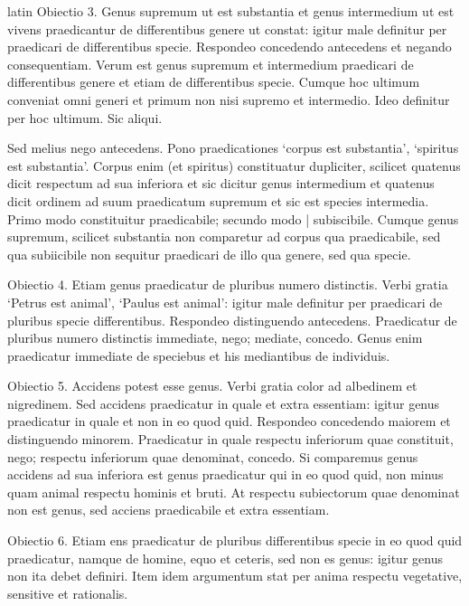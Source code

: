 \begin{otherlanguage*}{latin}
\pstart
Obiectio 3. Genus supremum ut est substantia et genus intermedium ut est vivens praedicantur de differentibus genere ut constat:
igitur male definitur per praedicari de differentibus specie. Respondeo concedendo antecedens et negando consequentiam. Verum est genus supremum et intermedium praedicari de differentibus genere et etiam de differentibus specie. Cumque hoc ultimum conveniat omni generi et primum non nisi supremo et intermedio. Ideo definitur per hoc ultimum. Sic aliqui. 
\pend

\pstart
Sed melius nego antecedens. Pono praedicationes `corpus est substantia', `spiritus est substantia'. Corpus enim (et spiritus) constituatur dupliciter, scilicet quatenus dicit respectum ad sua inferiora et sic dicitur genus intermedium et quatenus dicit ordinem ad suum praedicatum supremum et sic est species intermedia. Primo modo constituitur praedicabile; secundo modo \textnormal{|} subiscibile. Cumque genus supremum, scilicet substantia non comparetur ad corpus qua praedicabile, sed qua subiicibile non sequitur praedicari de illo qua genere, sed qua specie. 
\pend

\pstart
Obiectio 4. Etiam genus praedicatur de pluribus numero distinctis. Verbi gratia `Petrus est animal', `Paulus est animal':
igitur male definitur per praedicari de pluribus specie differentibus. Respondeo distinguendo antecedens. Praedicatur de pluribus numero distinctis immediate, nego; mediate, concedo. Genus enim praedicatur immediate de speciebus et his mediantibus de individuis. 
\pend

\pstart
Obiectio 5. Accidens potest esse genus. Verbi gratia color ad albedinem et nigredinem. Sed accidens praedicatur in quale et extra essentiam:
igitur genus praedicatur in quale et non in eo quod quid. Respondeo concedendo maiorem et distinguendo minorem. Praedicatur in quale respectu inferiorum quae constituit, nego; respectu inferiorum quae denominat, concedo. Si comparemus genus accidens ad sua inferiora est genus praedicatur qui in eo quod quid, non minus quam animal respectu hominis et bruti. At respectu subiectorum quae denominat non est genus, sed acciens praedicabile et extra essentiam. 
\pend

\pstart
Obiectio 6. Etiam ens praedicatur de pluribus differentibus specie in eo quod quid praedicatur, namque de homine, equo et ceteris, sed non es genus:
igitur genus non ita debet definiri. Item idem argumentum stat per anima respectu vegetative, sensitive et rationalis. 
\pend


\end{otherlanguage*}
